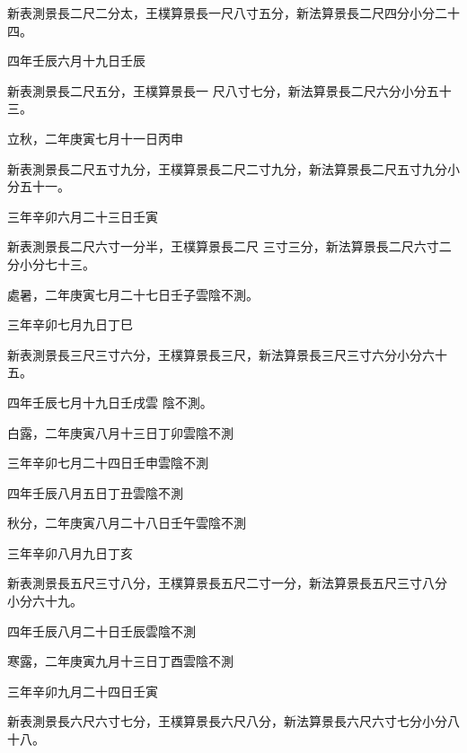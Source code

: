 \begin{pinyinscope}
 新表測景長二尺二分太，王樸算景長一尺八寸五分，新法算景長二尺四分小分二十四。



 四年壬辰六月十九日壬辰



 新表測景長二尺五分，王樸算景長一
 尺八寸七分，新法算景長二尺六分小分五十三。



 立秋，二年庚寅七月十一日丙申



 新表測景長二尺五寸九分，王樸算景長二尺二寸九分，新法算景長二尺五寸九分小分五十一。



 三年辛卯六月二十三日壬寅



 新表測景長二尺六寸一分半，王樸算景長二尺
 三寸三分，新法算景長二尺六寸二分小分七十三。



 處暑，二年庚寅七月二十七日壬子雲陰不測。



 三年辛卯七月九日丁巳



 新表測景長三尺三寸六分，王樸算景長三尺，新法算景長三尺三寸六分小分六十五。



 四年壬辰七月十九日壬戌雲
 陰不測。



 白露，二年庚寅八月十三日丁卯雲陰不測



 三年辛卯七月二十四日壬申雲陰不測



 四年壬辰八月五日丁丑雲陰不測



 秋分，二年庚寅八月二十八日壬午雲陰不測



 三年辛卯八月九日丁亥



 新表測景長五尺三寸八分，王樸算景長五尺二寸一分，新法算景長五尺三寸八分
 小分六十九。



 四年壬辰八月二十日壬辰雲陰不測



 寒露，二年庚寅九月十三日丁酉雲陰不測



 三年辛卯九月二十四日壬寅



 新表測景長六尺六寸七分，王樸算景長六尺八分，新法算景長六尺六寸七分小分八十八。




\end{pinyinscope}
